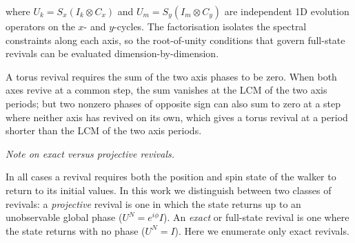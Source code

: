 where $U_k = S_x (I_k \otimes C_x)$ and $U_m = S_y (I_m \otimes C_y)$
are independent 1D evolution operators on the $x$- and $y$-cycles.
The factorisation isolates the spectral constraints along each axis,
so the root-of-unity conditions that govern full-state revivals can
be evaluated dimension-by-dimension.

A torus revival requires the sum of the two axis phases to be zero. When both axes revive 
at a common step, the sum vanishes at the LCM of the two axis periods; but two nonzero 
phases of opposite sign can also sum to zero at a step where neither axis has revived on its 
own, which gives a torus revival at a period shorter than the LCM of the two axis periods.

\emph{Note on exact versus projective revivals.}

In all cases a revival requires both the position and spin state of the walker to
return to its initial values.  In this work we distinguish between two classes of revivals:
a \emph{projective} revival is one in which the state returns up to an
unobservable global phase ($U^N = e^{i\phi} I$).  An \emph{exact}
or full-state revival is one where the state returns with no phase ($U^N = I$). 
Here we enumerate only exact revivals. 

